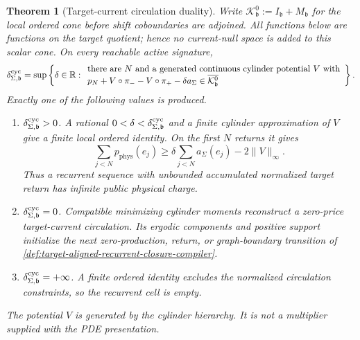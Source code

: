 \documentclass[11pt]{article}
\numberwithin{section}{part}
\theoremstyle{plain}
\newtheorem{theorem}{Theorem}[section]
\theoremstyle{definition}
\theoremstyle{remark}
\newcommand{\Phys}{\mathrm{phys}}
\begin{document}
\begin{theorem}[Target-current circulation duality]
\label{thm:target-current-circulation-duality}
Write
\(\mathcal K^{0}_{\mathfrak b}:=I_{\mathfrak b}+M_{\mathfrak b}\) for the
local ordered cone before shift coboundaries are adjoined.  All functions
below are functions on the target quotient; hence no current-null space is
added to this scalar cone.  On every reachable active signature,
\begin{equation}
 \label{eq:target-current-circulation-duality}
 \delta^{\rm cyc}_{\Sigma,\mathfrak b}
 =\sup\left\{\delta\in\mathbb R:
 \begin{array}{l}
 \text{there are }N\text{ and a generated continuous cylinder potential }V
 \text{ with}\\
 p_N+V\circ\pi_- -V\circ\pi_+
       -\delta a_\Sigma\in
       \overline{\mathcal K^{0}_{\mathfrak b}}
 \end{array}\right\}.
\end{equation}
Exactly one of the following values is produced.
\begin{enumerate}[label=\textup{(D\arabic*)}]
\item \(\delta^{\rm cyc}_{\Sigma,\mathfrak b}>0\).  A rational
\(0<\delta<\delta^{\rm cyc}_{\Sigma,\mathfrak b}\) and a finite cylinder
approximation of \(V\) give a finite local ordered identity.  On the first
\(N\) returns it gives
\[
 \sum_{j<N}p_{\Phys}(e_j)
 \ge \delta\sum_{j<N}a_\Sigma(e_j)-2\lVert V\rVert_\infty.
\]
Thus a recurrent sequence with unbounded accumulated normalized target
return has infinite public physical charge.
\item \(\delta^{\rm cyc}_{\Sigma,\mathfrak b}=0\).  Compatible minimizing
cylinder moments reconstruct a zero-price target-current circulation.  Its
ergodic components and positive support initialize the next zero-production,
return, or graph-boundary transition of
\cref{def:target-aligned-recurrent-closure-compiler}.
\item \(\delta^{\rm cyc}_{\Sigma,\mathfrak b}=+\infty\).  A finite ordered
identity excludes the normalized circulation constraints, so the recurrent
cell is empty.
\end{enumerate}
The potential \(V\) is generated by the cylinder hierarchy.  It is not a
multiplier supplied with the PDE presentation.
\end{theorem}
\end{document}
